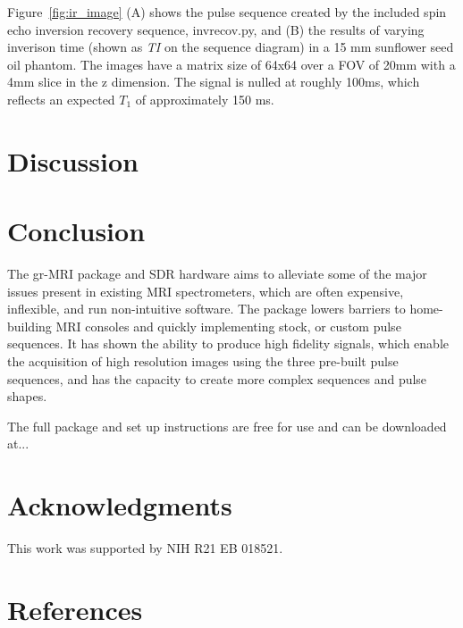 \documentclass[review]{elsarticle}
\begin{document}
\indent Figure~\ref{fig:ir_image} (A) shows the pulse sequence created by the included spin echo inversion recovery sequence, invrecov.py, and (B) the results of varying inverison time (shown as \textit{TI} on the sequence diagram) in a 15 mm sunflower seed oil phantom.  The images have a matrix size of 64x64 over a FOV of 20mm with a 4mm slice in the z dimension.  The signal is nulled at roughly 100ms, which reflects an expected $T_1$ of approximately 150 ms.

\section{Discussion}
\indent


\section{Conclusion}
\indent The gr-MRI package and SDR hardware aims to alleviate some of the major issues present in existing MRI spectrometers, which are often expensive, inflexible, and run non-intuitive software.  The package lowers barriers to home-building MRI consoles and quickly implementing stock, or custom pulse sequences.  It has shown the ability to produce high fidelity signals, which enable the acquisition of high resolution images using the three pre-built pulse sequences, and has the capacity to create more complex sequences and pulse shapes.

The full package and set up instructions are free for use and can be downloaded at...

\section*{Acknowledgments}

This work was supported by NIH R21 EB 018521.




\section*{References}
{}

\end{document}
